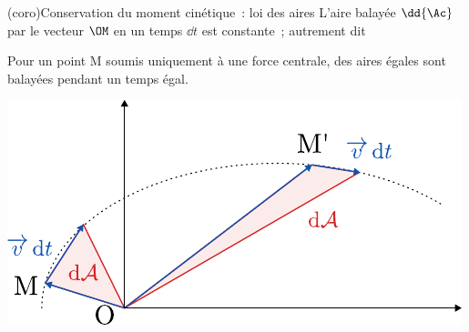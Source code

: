 \documentclass[../../main/main.tex]{subfiles}
\begin{document}
\begin{tcb*}[sidebyside](coro){Conservation du moment cinétique~: loi des aires}
	L'aire balayée $\dd{\Ac}$ par le vecteur $\OM$ en un temps $\dd{t}$ est
	constante~; autrement dit
	\begin{framed}
		\setlength{\topsep}{0pt}
		\begin{center}
			Pour un point M soumis uniquement à une force centrale, des aires égales
			sont balayées pendant un temps égal.
		\end{center}
	\end{framed}
	\tcblower
	\begin{center}
		\includegraphics[width=\linewidth]{kepler_2-aire}
	\end{center}
\end{tcb*}
\end{document}
